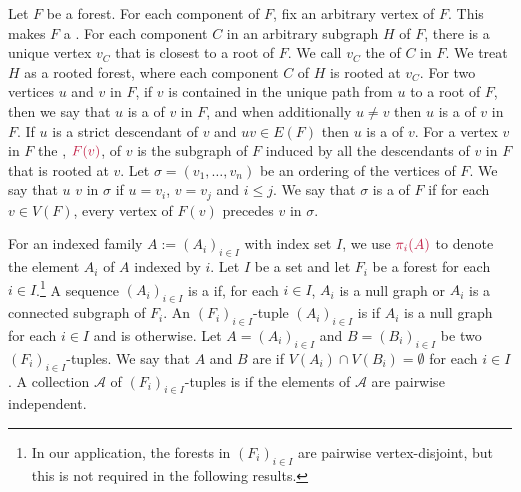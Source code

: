 \documentclass{patmorin}
\begin{document}
Let $F$ be a forest. For each component of $F$, fix an arbitrary vertex of $F$. This makes $F$ a . For each component $C$ in an arbitrary subgraph $H$ of $F$, there is a unique vertex $v_C$ that is closest to a root of $F$. We call $v_C$ the  of $C$ in $F$.  We treat $H$ as a rooted forest, where each component $C$ of $H$ is rooted at $v_C$. For two vertices $u$ and $v$ in $F$, if $v$ is contained in the unique path from $u$ to a root of $F$, then we say that $u$ is a  of $v$ in $F$, and when additionally $u\neq v$  then $u$ is a  of $v$ in $F$.  If $u$ is a strict descendant of $v$ and $uv\in E(F)$ then $u$ is a  of $v$. For a vertex $v$ in $F$ the , $\mathdefin{F(v)}$, of $v$ is the subgraph of $F$ induced by all the descendants of $v$ in $F$ that is rooted at $v$. Let $\sigma=(v_1,\ldots,v_n)$ be an ordering of the vertices of $F$. We say that $u$  $v$ in $\sigma$ if $u=v_i$, $v=v_j$ and $i\leq j$. We say that $\sigma$ is a  of $F$ if for each $v\in V(F)$, every vertex of $F(v)$ precedes $v$ in $\sigma$.

For an indexed family $A:=(A_i)_{i\in I}$ with index set $I$, we use $\mathdefin{\pi_i(A)}$ to denote the element $A_i$ of $A$ indexed by $i$.
Let $I$ be a set
and let $F_i$ be a forest for each $i\in I$.\footnote{In our application, the forests in $(F_i)_{i\in I}$ are pairwise vertex-disjoint, but this is not required in the following results.}
A sequence $(A_i)_{i\in I}$ is a  if, for each $i\in I$, $A_i$ is a null graph or $A_i$ is a connected subgraph of $F_i$.  An $(F_i)_{i\in I}$-tuple $(A_i)_{i\in I}$ is  if $A_i$ is a null graph for each $i\in I$ and is  otherwise. Let $A=(A_i)_{i\in I}$ and $B=(B_i)_{i\in I}$ be two $(F_i)_{i\in I}$-tuples. We say that $A$ and $B$ are  if $V(A_i)\cap V(B_i)=\emptyset$ for each $i\in I$. A collection $\mathcal{A}$ of $(F_i)_{i\in I}$-tuples is  if the elements of $\mathcal{A}$ are pairwise independent.
\end{document}
